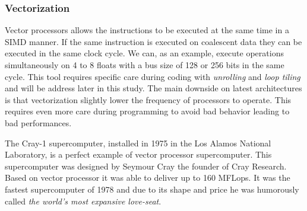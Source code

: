 \subsubsection{Vectorization} 
Vector processors allows the instructions to be executed at the same time in a SIMD manner. 
If the same instruction is executed on coalescent data they can be executed in the same clock cycle. 
We can, as an example, execute operations simultaneously on 4 to 8 floats with  a bus size of 128 or 256 bits in the same cycle.  
This tool requires specific care during coding with \textit{unrolling} and \textit{loop tiling} and will be address later in this study. 
The main downside on latest architectures is that vectorization slightly lower the frequency of processors to operate. 
This requires even more care during programming to avoid bad behavior leading to bad performances. 

The Cray-1 supercomputer\cite{russell1978cray}, installed in 1975 in the Los Alamos National Laboratory, is a perfect example of vector processor supercomputer.
This supercomputer was designed by Seymour Cray the founder of Cray Research.
Based on vector processor it was able to deliver up to 160 MFLops.
It was the fastest supercomputer of 1978 and due to its shape and price he was humorously called \textit{the world's most expansive love-seat}. 

